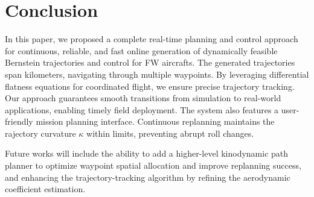 
\section{Conclusion}
\label{sec:Conclusion}
In this paper, we proposed a complete real-time planning and control approach for continuous, reliable, and fast online generation of dynamically feasible Bernstein trajectories and control for FW aircrafts. The generated trajectories span kilometers, navigating through multiple waypoints. By leveraging differential flatness equations for coordinated flight, we ensure precise trajectory tracking. Our approach guarantees smooth transitions from simulation to real-world applications, enabling timely field deployment. The system also features a user-friendly mission planning interface. Continuous replanning  maintains the rajectory curvature 
$\kappa$ within limits, preventing abrupt roll changes.

Future works will include the ability to add  a higher-level kinodynamic path planner to optimize waypoint spatial allocation and improve replanning success, and enhancing the trajectory-tracking algorithm by refining the aerodynamic coefficient estimation. 
